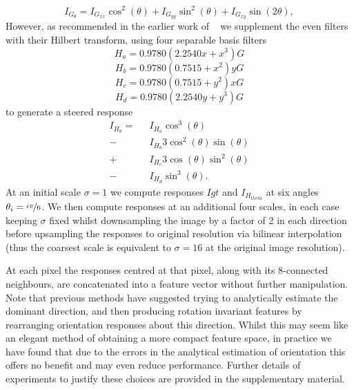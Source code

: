 \documentclass[runningheads,a4paper]{llncs}
\def\Ixx{I_{G_{xx}}}
\def\Ixy{I_{G_{xy}}}
\def\Iyy{I_{G_{yy}}}
\def\Iht{I_{H_{theta}}}
\begin{document}
%
\begin{equation}
I_{G_\theta} = \Ixx \cos^2(\theta) + \Iyy \sin^2(\theta) + \Ixy \sin(2\theta),
\label{e:secondderivs_response}
\end{equation}
%
However, as recommended in the earlier work of ~\cite{Freeman_Adelson_TPAMI91} we supplement the even filters with their Hilbert transform, using four separable basis filters
%
\begin{equation}
H_a = 0.9780(2.2540x + x^3)G
\label{e:secondderivs_hilberta}
\end{equation}
\begin{equation}
H_b = 0.9780(0.7515 + x^2)yG
\label{e:secondderivs_hilbertb}
\end{equation}
\begin{equation}
H_c = 0.9780(0.7515 + y^2)xG
\label{e:secondderivs_hilbertc}
\end{equation}
\begin{equation}
H_d = 0.9780(2.2540y + y^3)G
\label{e:secondderivs_hilbertd}
\end{equation}
%
to generate a steered response
\begin{align}
   I_{H_\theta} = ~~~ &I_{H_a} \cos^3(\theta) \nonumber \\
   								 -~ &I_{H_b} 3\cos^2(\theta)\sin(\theta) \nonumber \\
   								 +~ &I_{H_c} 3\cos(\theta)\sin^2(\theta) \nonumber \\
   								 -~ &I_{H_d} \sin^3(\theta).
\label{e:secondderivs_hilberts}
\end{align}
%
At an initial scale $\sigma=1$ we compute responses $Igt$ and $\Iht$ at six angles $\theta_i = \nicefrac{i\pi}{6}$. We then compute responses at an additional four scales, in each case keeping $\sigma$ fixed whilst downsampling the image by a factor of 2 in each direction before upsampling the responses to original resolution via bilinear interpolation (thus the coarsest scale is equivalent to $\sigma=16$ at the original image resolution).

At each pixel the responses centred at that pixel, along with its 8-connected neighbours, are concatenated into a feature vector without further manipulation. Note that previous methods have suggested trying to analytically estimate the dominant direction, and then producing rotation invariant features by rearranging orientation responses about this direction. Whilst this may seem like an elegant method of obtaining a more compact feature space, in practice we have found that due to the errors in the analytical estimation of orientation this offers no benefit and may even reduce performance. Further details of experiments to justify these choices are provided in the supplementary material.
\end{document}
